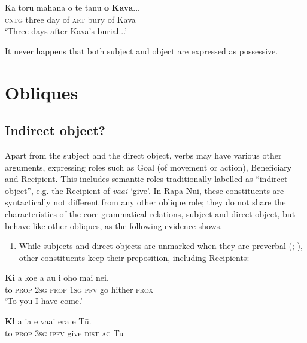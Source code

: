 \ea\label{ex:8.167}
\gll Ka toru mahana o te tanu \textbf{o} \textbf{Kava}...\\
\textsc{cntg} three day of \textsc{art} bury of Kava\\

\glt
‘Three days after Kava’s burial...’ \textstyleExampleref{[R229.358]} 
\z

It never happens that both subject and object are expressed as possessive.

\section{Obliques}\label{sec:8.8}
\subsection{Indirect object?}\label{sec:8.8.1}
Apart from the subject and the direct object, verbs may have various other arguments, expressing roles such as Goal (of movement or action), Beneficiary and Recipient. This includes semantic roles traditionally labelled as “indirect object”, e.g. the Recipient of \textit{\mbox{va{\ꞌ}ai}} ‘give’. In Rapa Nui, these constituents are syntactically not different from any other oblique role; they do not share the characteristics of the core grammatical relations, subject and direct object, but behave like other obliques, as the following evidence shows.

\begin{enumerate}
\item 
While subjects and direct objects are unmarked when they are preverbal (; ), other constituents keep their preposition, including Recipients:

\end{enumerate}
\ea\label{ex:8.168}
\gll \textbf{Ki} a koe a au i oho mai nei.\\
to \textsc{prop} \textsc{2sg} \textsc{prop} \textsc{1sg} \textsc{pfv} go hither \textsc{prox}\\

\glt 
‘To you I have come.’ \textstyleExampleref{[R617.181]} 
\z

\ea\label{ex:8.169}
\gll \textbf{Ki} a ia e va{\ꞌ}ai era e Tū. \\
to \textsc{prop} \textsc{3sg} \textsc{ipfv} give \textsc{dist} \textsc{ag} Tu \\

